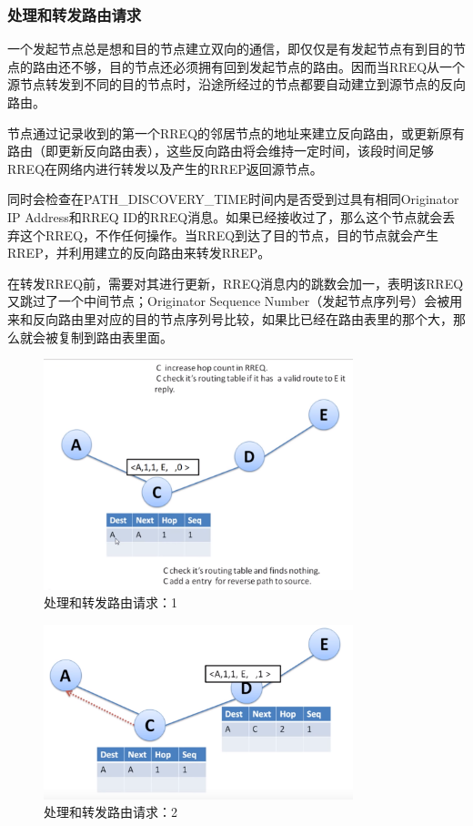 \documentclass[12pt,a4paper]{article}
\begin{document}
\subsubsection{处理和转发路由请求}
一个发起节点总是想和目的节点建立双向的通信，即仅仅是有发起节点有到目的节点的路由还不够，目的节点还必须拥有回到发起节点的路由。因而当RREQ从一个源节点转发到不同的目的节点时，沿途所经过的节点都要自动建立到源节点的反向路由。

节点通过记录收到的第一个RREQ的邻居节点的地址来建立反向路由，或更新原有路由（即更新反向路由表），这些反向路由将会维持一定时间，该段时间足够RREQ在网络内进行转发以及产生的RREP返回源节点。

同时会检查在PATH\_DISCOVERY\_TIME时间内是否受到过具有相同Originator IP Address和RREQ ID的RREQ消息。如果已经接收过了，那么这个节点就会丢弃这个RREQ，不作任何操作。当RREQ到达了目的节点，目的节点就会产生RREP，并利用建立的反向路由来转发RREP。

在转发RREQ前，需要对其进行更新，RREQ消息内的跳数会加一，表明该RREQ又跳过了一个中间节点；Originator Sequence Number（发起节点序列号）会被用来和反向路由里对应的目的节点序列号比较，如果比已经在路由表里的那个大，那么就会被复制到路由表里面。

\begin{figure}[htb]
\centering
\includegraphics[width=9cm]{handle_route_request_1}
\caption{处理和转发路由请求：1}
\end{figure}

\begin{figure}[htb]
\centering
\includegraphics[width=9cm]{handle_route_request_2}
\caption{处理和转发路由请求：2}
\end{figure}
\end{document}
